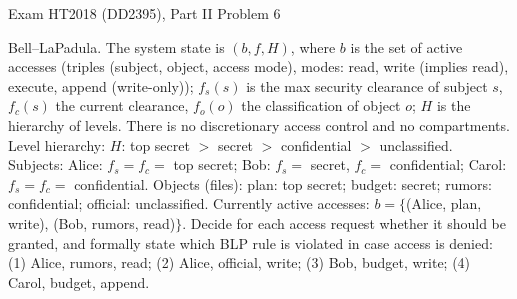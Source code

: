 \documentclass[12pt, a4paper]{article}
\begin{document}
\begin{practicebox}{Exam HT2018 (DD2395), Part II Problem 6}
\begin{problembox}
Bell--LaPadula. The system state is $(b, f, H)$, where $b$ is the set of active accesses (triples (subject, object, access mode), modes: read, write (implies read), execute, append (write-only)); $f_s(s)$ is the max security clearance of subject $s$, $f_c(s)$ the current clearance, $f_o(o)$ the classification of object $o$; $H$ is the hierarchy of levels. There is no discretionary access control and no compartments. Level hierarchy: $H$: top secret $>$ secret $>$ confidential $>$ unclassified. Subjects: Alice: $f_s = f_c = $ top secret; Bob: $f_s = $ secret, $f_c = $ confidential; Carol: $f_s = f_c = $ confidential. Objects (files): plan: top secret; budget: secret; rumors: confidential; official: unclassified. Currently active accesses: $b = \{$(Alice, plan, write), (Bob, rumors, read)$\}$. Decide for each access request whether it should be granted, and formally state which BLP rule is violated in case access is denied: (1) Alice, rumors, read; (2) Alice, official, write; (3) Bob, budget, write; (4) Carol, budget, append.
\end{problembox}


\end{practicebox}
\end{document}
